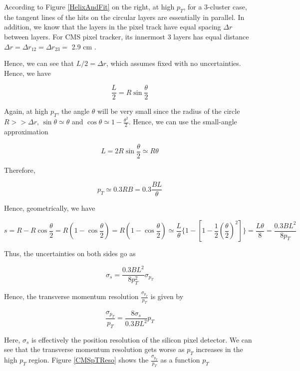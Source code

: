 According to Figure \ref{HelixAndFit} on the right, at high $p_T$,  for a 3-cluster case, the tangent lines of the hits on the circular layers are essentially in parallel. In addition, we know that the layers in the pixel track have equal spacing $\Delta r$ between layers. For CMS pixel tracker, its innermost 3 layers has equal distance $\Delta r = \Delta r_{12} = \Delta r_{23} =$ 2.9 cm \cite{CMSPIXInfo}. 


Hence, we can see that $L/2 = \Delta r$, which assumes fixed with no uncertainties. Hence, we have

\begin{equation}
\frac{L}{2} = R \sin \frac{\theta}{2}
\end{equation}

Again, at high $p_T$, the angle $\theta$ will be very small since the radius of the circle $R >> \Delta r$, $\sin\theta \simeq \theta$ and $\cos\theta \simeq 1 - \frac{\theta^2}{2}$. Hence, we can use the small-angle approximation

\begin{equation}
L = 2 R \sin \frac{\theta}{2} \simeq R \theta
\end{equation}

Therefore,

\begin{equation}
p_T  \simeq 0.3 RB = 0.3 \frac{BL}{\theta}
\end{equation}


Hence, geometrically, we have


\begin{equation}
s = R - R \cos \frac{\theta}{2} = R (1 -  \cos \frac{\theta}{2}) =  R (1 -  \cos \frac{\theta}{2})  \simeq  \frac{L}{\theta} \{1 - [1 - \frac{1}{2} (\frac{\theta}{2})^2] \} =  \frac{L\theta}{8} = \frac{0.3BL^2}{8p_T}
\end{equation}

Thus, the uncertainties on both sides go as 

\begin{equation}
\sigma_s =  \frac{0.3BL^2}{8p_T^2} \sigma_{p_T}
\end{equation}

Hence, the transverse momentum resolution $\frac{\sigma_{p_T}}{p_T}$ is given by 


\begin{equation}
\frac{\sigma_{p_T}}{p_T} = \frac{8\sigma_s}{0.3BL^2} p_T
\end{equation}

Here, $\sigma_s$ is effectively the position resolution of the silicon pixel detector. We can see that the transverse momentum resolution gets worse as $p_T$ increases in the high $p_T$ region. Figure \ref{CMSpTReso} shows the $\frac{\sigma_{p_T}}{p_T}$ as a function $p_T$


